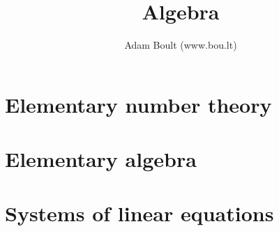 \documentclass[oneside]{book}
\begin{document}
\author{Adam Boult (www.bou.lt)}
\title{Algebra}
\maketitle

\setcounter{tocdepth}{0}
\tableofcontents



\part{Elementary number theory}







\part{Elementary algebra}





\part{Systems of linear equations}


\end{document}
